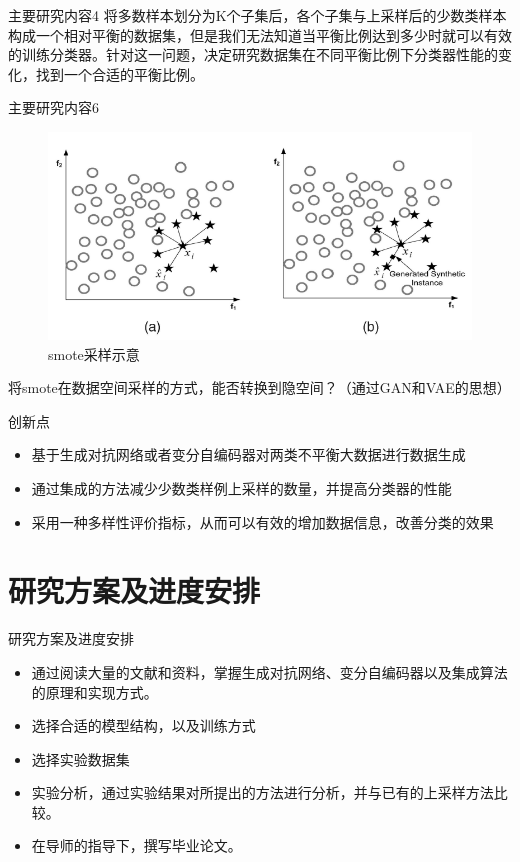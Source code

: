 \documentclass{beamer}
\begin{document}
\begin{frame}{主要研究内容4}\pause
    将多数样本划分为K个子集后，各个子集与上采样后的少数类样本构成一个相对平衡的数据集，但是我们无法知道当平衡比例达到多少时就可以有效的训练分类器。针对这一问题，决定研究数据集在不同平衡比例下分类器性能的变化，找到一个合适的平衡比例。
\end{frame}

\begin{frame}{主要研究内容6}\pause
    \begin{figure}[t]
        \includegraphics[scale=0.25]{smote.png}
        \caption{smote采样示意}
    \end{figure}
    将smote在数据空间采样的方式，能否转换到隐空间？（通过GAN和VAE的思想）
\end{frame}

\begin{frame}{创新点}\pause
    \begin{itemize}
        \item 基于生成对抗网络或者变分自编码器对两类不平衡大数据进行数据生成
        \item 通过集成的方法减少少数类样例上采样的数量，并提高分类器的性能
        \item 采用一种多样性评价指标，从而可以有效的增加数据信息，改善分类的效果
    \end{itemize}
\end{frame}



\section{研究方案及进度安排}
\begin{frame}{研究方案及进度安排}\pause
    \begin{itemize}
        \item 
        通过阅读大量的文献和资料，掌握生成对抗网络、变分自编码器以及集成算法的原理和实现方式。
        \item 
        选择合适的模型结构，以及训练方式
        \item 
        选择实验数据集
        \item 
        实验分析，通过实验结果对所提出的方法进行分析，并与已有的上采样方法比较。
        \item 
        在导师的指导下，撰写毕业论文。
    \end{itemize}
\end{frame}
\end{document}
